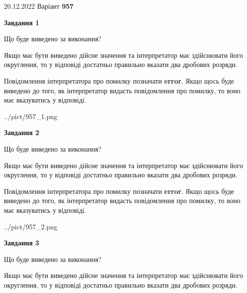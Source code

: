 \documentclass[12pt, ukrainian]{article}
\begin{document}
{20.12.2022 Варіант \No \textbf { 957 }\par}
{
\begin {Large}

{\begin {center}\textbf{Завдання 1}\end {center}}\par
Що буде виведено за виконання? \par

Якщо має бути виведено дійсне значення та інтерпретатор має здійснювати його округлення, 
то у відповіді достатньо правильно вказати два дробових розряди.

Повідомлення інтерпретатора про помилку позначати \textbf{error}.
Якщо щось буде виведено до того, як інтерпретатор видасть повідомлення про помилку, 
то воно має вказуватись у відповіді. \par

\begin{center}
	{../pict/957_1.png}
\end{center}
\newpage

{\begin {center}\textbf{Завдання 2}\end {center}}\par
Що буде виведено за виконання? \par

Якщо має бути виведено дійсне значення та інтерпретатор має здійснювати його округлення, 
то у відповіді достатньо правильно вказати два дробових розряди.

Повідомлення інтерпретатора про помилку позначати \textbf{error}.
Якщо щось буде виведено до того, як інтерпретатор видасть повідомлення про помилку, 
то воно має вказуватись у відповіді. \par

\begin{center}
	{../pict/957_2.png}
\end{center}
\newpage

{\begin {center}\textbf{Завдання 3}\end {center}}\par
Що буде виведено за виконання? \par

Якщо має бути виведено дійсне значення та інтерпретатор має здійснювати його округлення, 
то у відповіді достатньо правильно вказати два дробових розряди.


\end{Large}}
\end{document}
